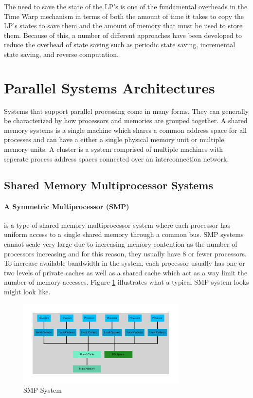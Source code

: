 \documentclass[11pt]{book}
\begin{document}
The need to save the state of the LP's is one of the fundamental overheads in the Time Warp
mechanism in terms of both the amount of time it takes to copy the LP's states to save them
and the amount of memory that must be used to store them. Because of this, a number of
different approaches have been developed to reduce the overhead of state saving such as
periodic state saving, incremental state saving, and reverse computation.

\section{Parallel Systems Architectures}

Systems that support parallel processing come in many forms. They can generally be characterized
by how processors and memories are grouped together. A shared memory systems is a single machine
which shares a common address space for all processes and can have a either a single physical
memory unit or multiple memory units. A cluster is a system comprised of multiple machines with
seperate process address spaces connected over an interconnection network. 

\subsection{Shared Memory Multiprocessor Systems}

\paragraph{A Symmetric Multiprocessor (SMP)} is a type of shared memory multiprocessor
system where each processor has uniform access to a single shared memory through a common
bus. SMP systems cannot scale very large due to increasing memory contention as the number of
processors increasing and for this reason, they usually have 8 or fewer processors.
To increase available bandwidth in the system, each processor usually has one or two
levels of private caches as well as a shared cache which act as a way limit the number of
memory accesses. Figure \ref{smp} illustrates what a typical SMP system looks might look
like.

\begin{figure}[H]
    \centering
    \includegraphics[width=0.75\textwidth,quiet]{figs/graphviz/smp.pdf}
    \caption{SMP System}\label{smp}
\end{figure}
\end{document}
